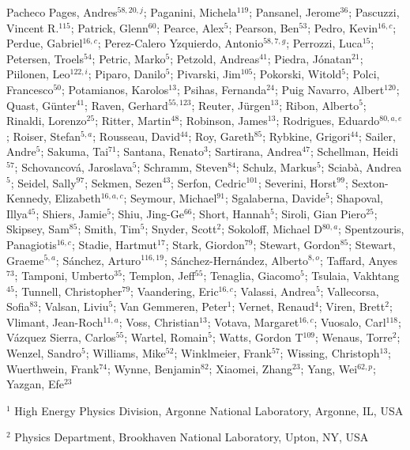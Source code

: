 Pacheco Pages, Andres$^{58,20,j}$;
Paganini, Michela$^{119}$;
Pansanel, Jerome$^{36}$;
Pascuzzi, Vincent R.$^{115}$;
Patrick, Glenn$^{60}$;
Pearce, Alex$^{5}$;
Pearson, Ben$^{53}$;
Pedro, Kevin$^{16,c}$;
Perdue, Gabriel$^{16,c}$;
Perez-Calero Yzquierdo, Antonio$^{58,7,g}$;
Perrozzi, Luca$^{15}$;
Petersen, Troels$^{54}$;
Petric, Marko$^{5}$;
Petzold, Andreas$^{41}$;
Piedra, Jónatan$^{21}$;
Piilonen, Leo$^{122,i}$;
Piparo, Danilo$^{5}$;
Pivarski, Jim$^{105}$;
Pokorski, Witold$^{5}$;
Polci, Francesco$^{50}$;
Potamianos, Karolos$^{13}$;
Psihas, Fernanda$^{24}$;
Puig Navarro, Albert$^{120}$;
Quast, Günter$^{41}$;
Raven, Gerhard$^{55,123}$;
Reuter, Jürgen$^{13}$;
Ribon, Alberto$^{5}$;
Rinaldi, Lorenzo$^{25}$;
Ritter, Martin$^{48}$;
Robinson, James$^{13}$;
Rodrigues, Eduardo$^{80,a,e}$;
Roiser, Stefan$^{5,a}$;
Rousseau, David$^{44}$;
Roy, Gareth$^{85}$;
Rybkine, Grigori$^{44}$;
Sailer, Andre$^{5}$;
Sakuma, Tai$^{71}$;
Santana, Renato$^{3}$;
Sartirana, Andrea$^{47}$;
Schellman, Heidi$^{57}$;
Schovancová, Jaroslava$^{5}$;
Schramm, Steven$^{84}$;
Schulz, Markus$^{5}$;
Sciabà, Andrea$^{5}$;
Seidel, Sally$^{97}$;
Sekmen, Sezen$^{43}$;
Serfon, Cedric$^{101}$;
Severini, Horst$^{99}$;
Sexton-Kennedy, Elizabeth$^{16,a,c}$;
Seymour, Michael$^{91}$;
Sgalaberna, Davide$^{5}$;
Shapoval, Illya$^{45}$;
Shiers, Jamie$^{5}$;
Shiu, Jing-Ge$^{66}$;
Short, Hannah$^{5}$;
Siroli, Gian Piero$^{25}$;
Skipsey, Sam$^{85}$;
Smith, Tim$^{5}$;
Snyder, Scott$^{2}$;
Sokoloff, Michael D$^{80,a}$;
Spentzouris, Panagiotis$^{16,c}$;
Stadie, Hartmut$^{17}$;
Stark, Giordon$^{79}$;
Stewart, Gordon$^{85}$;
Stewart, Graeme$^{5,a}$;
Sánchez, Arturo$^{116,19}$;
Sánchez-Hernández, Alberto$^{8,o}$;
Taffard, Anyes$^{73}$;
Tamponi, Umberto$^{35}$;
Templon, Jeff$^{55}$;
Tenaglia, Giacomo$^{5}$;
Tsulaia, Vakhtang$^{45}$;
Tunnell, Christopher$^{79}$;
Vaandering, Eric$^{16,c}$;
Valassi, Andrea$^{5}$;
Vallecorsa, Sofia$^{83}$;
Valsan, Liviu$^{5}$;
Van Gemmeren, Peter$^{1}$;
Vernet, Renaud$^{4}$;
Viren, Brett$^{2}$;
Vlimant, Jean-Roch$^{11,a}$;
Voss, Christian$^{13}$;
Votava, Margaret$^{16,c}$;
Vuosalo, Carl$^{118}$;
Vázquez Sierra, Carlos$^{55}$;
Wartel, Romain$^{5}$;
Watts, Gordon T$^{109}$;
Wenaus, Torre$^{2}$;
Wenzel, Sandro$^{5}$;
Williams, Mike$^{52}$;
Winklmeier, Frank$^{57}$;
Wissing, Christoph$^{13}$;
Wuerthwein, Frank$^{74}$;
Wynne, Benjamin$^{82}$;
Xiaomei, Zhang$^{23}$;
Yang, Wei$^{62,p}$;
Yazgan, Efe$^{23}$
\bigskip
\par {\footnotesize $^{1}$ High Energy Physics Division, Argonne National Laboratory, Argonne, IL, USA}
\par {\footnotesize $^{2}$ Physics Department, Brookhaven National Laboratory, Upton, NY, USA}
